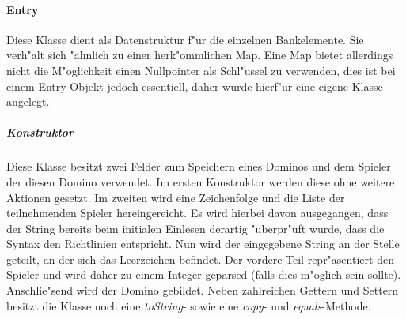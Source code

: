 \paragraph{Entry}
\label{par:entry}
Diese Klasse dient als Datenstruktur f"ur die einzelnen Bankelemente. Sie verh"alt sich "ahnlich zu einer herk"ommlichen Map. Eine Map bietet allerdings nicht die M"oglichkeit einen Nullpointer als Schl"ussel zu verwenden, dies ist bei einem Entry-Objekt jedoch essentiell, daher wurde hierf"ur eine eigene Klasse angelegt. 

\subparagraph{Konstruktor}
Diese Klasse besitzt zwei Felder zum Speichern eines Dominos und dem Spieler der diesen Domino verwendet. Im ersten Konstruktor werden diese ohne weitere Aktionen gesetzt. Im zweiten wird eine Zeichenfolge und die Liste der teilnehmenden Spieler hereingereicht. Es wird hierbei davon ausgegangen, dass der String bereits beim initialen Einlesen derartig "uberpr"uft wurde, dass die Syntax den Richtlinien entspricht. Nun wird der eingegebene String an der Stelle geteilt, an der sich das Leerzeichen befindet. Der vordere Teil repr"asentiert den Spieler und wird daher zu einem Integer geparsed (falls dies m"oglich sein sollte). Anschlie"send wird der Domino gebildet. Neben zahlreichen Gettern und Settern besitzt die Klasse noch eine \emph{toString}- sowie eine \emph{copy}- und \emph{equals}-Methode. 

